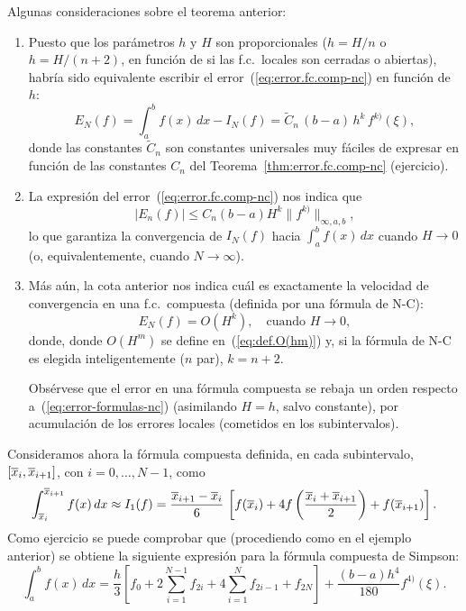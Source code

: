 \begin{remark}
  Algunas consideraciones sobre el teorema anterior:
  \begin{enumerate}
  \item Puesto que los parámetros $h$ y $H$ son proporcionales
    ($h=H/n$ o $h=H/(n+2)$, en función de si las f.c.\ locales son
    cerradas o abiertas), habría sido equivalente escribir el
    error~(\ref{eq:error.fc.comp-nc}) en función de $h$:
    \begin{equation}
      \label{eq:error.fc.comp-nc.bis}
      E_N(f)= \int_a^bf(x)\,dx - I_N(f)
      = \widetilde C_n \, (b-a) \, h^{k} \, f^{k)}(\xi),
    \end{equation}
    donde las constantes $\widetilde C_n$ son constantes universales
    muy fáciles de expresar en función de las constantes $C_n$ del
    Teorema~\ref{thm:error.fc.comp-nc} (ejercicio).
  \item La expresión del error~(\ref{eq:error.fc.comp-nc}) nos
    indica que
    \begin{equation*}
      |E_n(f)| \le C_n (b-a) H^k \|f^{k)}\|_{\infty,a,b},
    \end{equation*}
    lo que garantiza la convergencia de $I_N(f)$ hacia
    $\int_a^b f(x)\, dx$ cuando $H\to 0$ (o, equivalentemente, cuando
    $N \to\infty$).
  \item Más aún, la cota anterior nos indica cuál es exactamente la
    velocidad de convergencia en una f.c.\ compuesta (definida por una
    fórmula de N-C):
    \begin{equation*}
      E_N(f)=O(H^{k}), \quad \text{cuando } H\to 0,
    \end{equation*}
    donde, donde $O(H^m)$ se define en~(\ref{eq:def.O(hm)}) y, si la
    fórmula de N-C es elegida inteligentemente ($n$ par), $k=n+2$.

    Obsérvese que el error en una fórmula compuesta se rebaja un orden
    respecto a~(\ref{eq:error-formulas-nc}) (asimilando $H = h$, salvo
    constante), por acumulación de los errores locales (cometidos en
    los subintervalos).
  \end{enumerate}
\end{remark}

\begin{example} 
  Consideramos ahora la fórmula compuesta definida, en cada
  subintervalo, $[\overline x_{i},\overline x_{i+1}]$, con $i=0,\dots,N-1$, como
   \begin{equation*}
    \int_{\overline x_{i}}^{\overline x_{i+1}} f(x)\, dx \approx I_1(f)=
    \frac{\overline x_{i+1}-\overline x_{i}}{6} \, \left[f(\overline x_i) +
      4f\left(\frac{\overline x_{i}+\overline x_{i+1}}{2}\right)+f(\overline x_{i+1})\right].
  \end{equation*}
  Como ejercicio se puede comprobar que (procediendo como en el
  ejemplo anterior) se obtiene la siguiente expresión para la fórmula
  compuesta de Simpson:
  \begin{equation*}
    \int_a^b f(x)\,dx
    = \frac{h}{3} \left[
      f_0
      + 2\sum_{i=1}^{N-1} f_{2i}
      + 4\sum_{i=1}^{N} f_{2i-1}
      + f_{2N} \right]
    + \frac{(b-a)h^4}{180} f^{4)}(\xi).
  \end{equation*}
\end{example}

